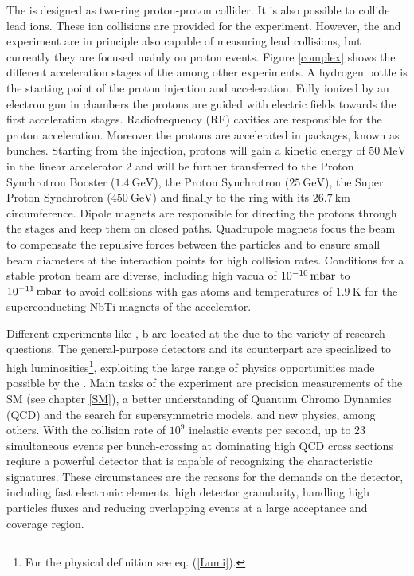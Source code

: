 The {\LHC} is designed as two-ring proton-proton collider. It is also possible to collide lead ions. These ion collisions are provided for the {\ALICE}\cite{ALICE} experiment. However, the {\ATLAS} and {\CMS} experiment are in principle also capable of measuring lead collisions, but currently they are focused mainly on proton events. Figure \ref{complex} shows the different acceleration stages of the {\LHC} among other {\CERN} experiments.\newline
A hydrogen bottle is the starting point of the proton injection and acceleration. Fully ionized by an electron gun in chambers the protons are guided with electric fields towards the first acceleration stages. Radiofrequency (RF) cavities are responsible for the proton acceleration. Moreover the protons are accelerated in packages, known as bunches. \cite{LHCJINST}\cite{LHCSchule} Starting from the injection, protons will gain a kinetic energy of $\SI{50}{\mega\electronvolt}$ in the linear accelerator {\LINAC}2 and will be further transferred to the Proton Synchrotron Booster ($\SI{1.4}{\giga\electronvolt}$), the Proton Synchrotron ($\SI{25}{\giga\electronvolt}$), the Super Proton Synchrotron ($\SI{450}{\giga\electronvolt}$) and finally to the {\LHC} ring with its $\SI{26.7}{\kilo\meter}$ circumference. \cite{CERNabout} Dipole magnets are responsible for directing the protons through the stages and keep them on closed paths. Quadrupole magnets focus the beam to compensate the repulsive forces between the particles and to ensure small beam diameters at the interaction points for high collision rates. Conditions for a stable proton beam are diverse, including high vacua of $\SI{E-10}{\milli\bar}$ to $\SI{E-11}{\milli\bar}$ to avoid collisions with gas atoms and temperatures of $\SI{1.9}{\kelvin}$ for the superconducting NbTi-magnets of the accelerator. \cite{LHCJINST}\cite{LHCSchule}\par
Different experiments like \ALICE\cite{ALICE}, {{\LHC}}b\cite{LHCb} are located at the {\LHC} due to the variety of research questions. The general-purpose detectors {\ATLAS} and its counterpart {\CMS}\cite{CMS} are specialized to high luminosities\footnote{For the physical definition see eq. (\ref{Lumi}).}, exploiting the large range of physics opportunities made possible by the {\LHC}. Main tasks of the {\ATLAS} experiment are precision measurements of the SM (see chapter \ref{SM}), a better understanding of Quantum Chromo Dynamics (QCD) and the search for supersymmetric models, and new physics, among others. With the {\LHC} collision rate of $10^9$ inelastic events per second, up to $23$ simultaneous events per bunch-crossing at dominating high QCD cross sections reqiure a powerful detector that is capable of recognizing the characteristic signatures. These circumstances are the reasons for the demands on the {\ATLAS} detector, including fast electronic elements, high detector granularity, handling high particles fluxes and reducing overlapping events at a large acceptance and coverage region. \cite{ATLASJINST}       

